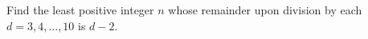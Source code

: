 Find the least positive integer $n$ whose remainder upon division by each $d=3,4,\ldots,10$ is $d-2$.
